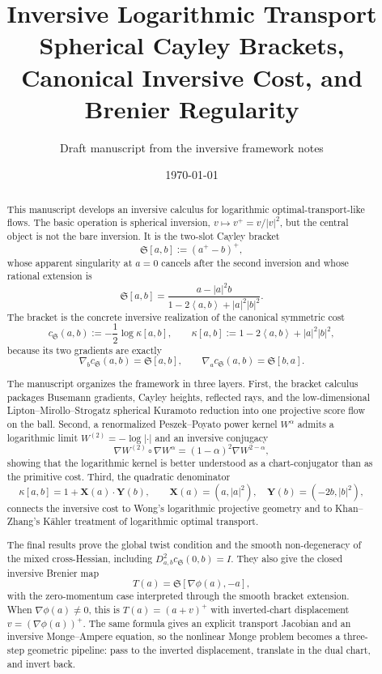 \documentclass[11pt]{article}
\title{Inversive Logarithmic Transport\\
\large Spherical Cayley Brackets, Canonical Inversive Cost, and Brenier Regularity}
\author{Draft manuscript from the inversive framework notes}
\date{\today}
\newcommand{\ip}[2]{\left\langle #1,#2\right\rangle}
\newcommand{\norm}[1]{\left|#1\right|}
\newcommand{\cs}{c_{\mathfrak S}}
\newcommand{\grad}{\nabla}
\newcommand{\Sbr}[2]{\mathfrak S[#1,#2]}
\newcommand{\kap}[2]{\kappa[#1,#2]}
\newcommand{\Xlift}{\mathbf X}
\newcommand{\Ylift}{\mathbf Y}
\begin{document}
\maketitle

\begin{abstract}
This manuscript develops an inversive calculus for logarithmic optimal-transport-like flows.  The basic operation is spherical inversion, $v\mapsto v^+=v/\norm v^2$, but the central object is not the bare inversion.  It is the two-slot Cayley bracket
\[
    \Sbr{a}{b}:=(a^+-b)^+,
\]
whose apparent singularity at $a=0$ cancels after the second inversion and whose rational extension is
\[
    \Sbr{a}{b}=\frac{a-\norm a^2 b}{1-2\ip a b+\norm a^2\norm b^2}.
\]
The bracket is the concrete inversive realization of the canonical symmetric cost
\[
    \cs(a,b):=-\frac12\log\kap{a}{b},
    \qquad
    \kap{a}{b}:=1-2\ip a b+\norm a^2\norm b^2,
\]
because its two gradients are exactly
\[
    \grad_b\cs(a,b)=\Sbr{a}{b},
    \qquad
    \grad_a\cs(a,b)=\Sbr{b}{a}.
\]

The manuscript organizes the framework in three layers.  First, the bracket calculus packages Busemann gradients, Cayley heights, reflected rays, and the low-dimensional Lipton--Mirollo--Strogatz spherical Kuramoto reduction into one projective score flow on the ball.  Second, a renormalized Peszek--Poyato power kernel $W^\alpha$ admits a logarithmic limit $W^{(2)}=-\log\norm{\cdot}$ and an inversive conjugacy
\[
    \grad W^{(2)}\circ \grad W^\alpha=(1-\alpha)^2\grad W^{2-\alpha},
\]
showing that the logarithmic kernel is better understood as a chart-conjugator than as the primitive cost.  Third, the quadratic denominator
\[
    \kap{a}{b}=1+\Xlift(a)\cdot \Ylift(b),
    \qquad
    \Xlift(a)=(a,\norm a^2),\quad \Ylift(b)=(-2b,\norm b^2),
\]
connects the inversive cost to Wong's logarithmic projective geometry and to Khan--Zhang's K\"ahler treatment of logarithmic optimal transport.

The final results prove the global twist condition and the smooth non-degeneracy of the mixed cross-Hessian, including $D^2_{a,b}\cs(0,b)=I$.  They also give the closed inversive Brenier map
\[
    T(a)=\Sbr{\grad\phi(a)}{-a},
\]
with the zero-momentum case interpreted through the smooth bracket extension.  When $\grad\phi(a)\neq0$, this is $T(a)=(a+v)^+$ with inverted-chart displacement $v=(\grad\phi(a))^+$.  The same formula gives an explicit transport Jacobian and an inversive Monge--Ampere equation, so the nonlinear Monge problem becomes a three-step geometric pipeline: pass to the inverted displacement, translate in the dual chart, and invert back.
\end{abstract}
\end{document}

